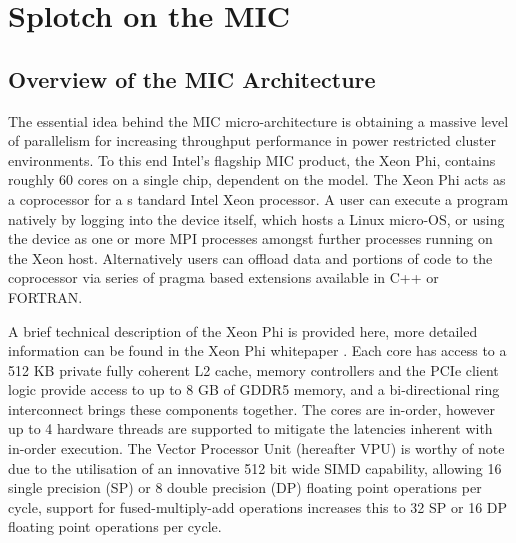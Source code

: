 \documentclass[runningheads,a4paper]{llncs}
\begin{document}



\section{Splotch on the MIC}
\label{sect:micsplotch}


\subsection{Overview of the MIC Architecture}
\label{sect:mic}

The essential idea behind the MIC micro-architecture is obtaining a massive level of parallelism for increasing throughput 
performance in power restricted cluster environments. To this end Intel's flagship MIC product, the Xeon Phi, 
contains roughly 60 cores on a single chip, dependent on the model. The Xeon Phi acts as a coprocessor for a s
tandard Intel Xeon processor. A user can execute a program natively by logging into the device itself, which hosts 
a Linux micro-OS, or using the device as one or more MPI processes amongst further processes running on the 
Xeon host. Alternatively users can offload data and portions of code to the coprocessor via series of pragma 
based extensions available in C++ or FORTRAN.

A brief technical description of the Xeon Phi is provided here, more detailed information can be found in the 
Xeon Phi whitepaper \cite{xeonphi}. Each core has access to a 512 KB private fully coherent L2 cache, memory controllers 
and the PCIe client logic provide access to up to 8 GB of GDDR5 memory, and a bi-directional ring interconnect 
brings these components together. The cores are in-order, however up to 4 hardware threads are supported to mitigate 
the latencies inherent with in-order execution. The Vector Processor Unit (hereafter VPU) is worthy of note due to 
the utilisation of an innovative 512 bit wide SIMD capability, allowing 16 single precision (SP) or 8 double precision 
(DP) floating point operations per cycle, support for fused-multiply-add operations increases this to 32 SP or 16 DP 
floating point operations per cycle. 
\end{document}
